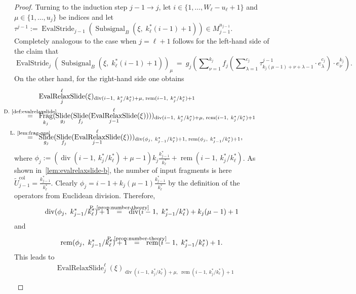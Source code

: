 \documentclass[journal]{IEEEtran}
\newcommand{\ROI}{B}
\newcommand{\discint}[2]{\{#1,\dotsc,#2\}}
\newcommand{\inint}[2]{\in\discint{#1}{#2}}
\DeclareMathOperator{\Subsignal}{Subsignal}
\DeclareMathOperator{\Slide}{Slide}
\DeclareMathOperator{\Fragmentation}{Frag}
\DeclareMathOperator{\EvalStride}{EvalStride}
\renewcommand{\div}[2]{\operatorname{div}(#1,\ #2)}
\newcommand{\rem}[2]{\operatorname{rem}(#1,\ #2)}
\newcommand{\col}{\operatorname{col}}
\newcommand{\equsing}[1]{\overset{\mathclap{\text{#1}}}{=}}
\DeclareMathOperator{\EvalRelaxSlide}{EvalRelaxSlide}
\begin{document}
\begin{proof}
Turning to the induction step $j - 1 \to j$, let $i\inint{1}{W_\ell - u_\ell + 1}$ and $\mu\inint{1}{u_j}$ be indices and let $\tau^{j - 1} := \EvalStride_{j - 1}(\Subsignal_\ROI(\xi,\; k_\ell^*(i - 1) + 1))\in M_{j - 1}^{u_{j - 1}}$.
Completely analogous to the case when $j = \ell + 1$ follows for the left-hand side of the claim that
\begin{displaymath}
   \EvalStride_j(\Subsignal_\ROI(\xi,\; k_\ell^*(i - 1) + 1))_\mu
  \ =\ g_j\!\left( \sum\nolimits_{\nu = 1}^{k_j} f_j\!\left( \sum\nolimits_{\lambda = 1}^{c_j} \tau^{j - 1}_{k_j(\mu - 1) + \nu + \lambda - 1}\cdot e_\lambda^{c_j} \right) \cdot e_\nu^{k_j} \right)\text{.}
\end{displaymath}
On the other hand, for the right-hand side one obtains
\begin{align*}
  & \EvalRelaxSlide_j^\ell(\xi)_{\div{i - 1}{k_j^* / k_\ell^*} + \mu,\;\rem{i - 1}{k_j^* / k_\ell^*} + 1}\\
  \equsing{D.~\ref{def:evalrelaxslide}}\ \ & \Fragmentation_{k_j}(\Slide_{g_j}(\Slide_{f_j}(\EvalRelaxSlide_{j - 1}^\ell(\xi))))_{\div{i - 1}{k_j^* / k_\ell^*} + \mu,\;\rem{i - 1}{k_j^* / k_\ell^*} + 1}\\
  \equsing{L.~\ref{lem:frag-ops}}\ \ & \Slide_{g_j}(\Slide_{f_j}(\EvalRelaxSlide_{j - 1}^\ell(\xi)))_{\div{\phi_j}{k_{j - 1}^* / k_\ell^*} + 1,\;\rem{\phi_j}{k_{j - 1}^* / k_\ell^*} + 1}\text{,}
\end{align*}
where $\phi_j := (\div{i - 1}{k_j^* / k_\ell^*} + \mu - 1)k_j\frac{k_{j - 1}^*}{k_\ell^*} + \rem{i - 1}{k_j^* / k_\ell^*}$.
As shown in~\ref{lem:evalrelaxslide-b}, the number of input fragments is here $\tilde{U}_{j - 1}^{\col} = \frac{k_{j - 1}^*}{k_\ell^*}$.
Clearly $\phi_j = i - 1 + k_j(\mu - 1)\frac{k_{j - 1}^*}{k_\ell^*}$ by the definition of the operators from Euclidean division.
Therefore,
\begin{displaymath}
  \div{\phi_j}{k_{j - 1}^* / k_\ell^*} + 1
  \ \ \equsing{P.~\ref{prop:number-theory}}\ \ \div{i - 1}{k_{j - 1}^* / k_\ell^*} + k_j(\mu - 1) + 1
\end{displaymath}
and
\begin{displaymath}
  \rem{\phi_j}{k_{j - 1}^* / k_\ell^*} + 1
  \ \ \equsing{P.~\ref{prop:number-theory}}\ \ \rem{i - 1}{k_{j - 1}^* / k_\ell^*} + 1\text{.}
\end{displaymath}
This leads to
\begin{align*}
  & \EvalRelaxSlide_j^\ell(\xi)_{\div{i - 1}{k_j^* / k_\ell^*} + \mu,\;\rem{i - 1}{k_j^* / k_\ell^*} + 1}\\

\end{align*}
\end{proof}
\end{document}
